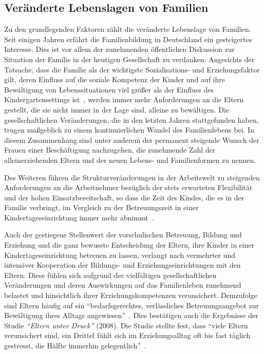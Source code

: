\documentclass[12pt,a4paper]{article}
\begin{document}
\subsection{Veränderte Lebenslagen von Familien}
Zu den grundlegenden Faktoren zählt die veränderte Lebenslage von Familien. Seit einigen Jahren erfährt die Familienbildung in Deutschland ein gesteigertes Interesse. Dies ist vor allem der zunehmenden öffentlichen Diskussion zur Situation der Familie in der heutigen Gesellschaft zu verdanken. Angesichts der Tatsache, dass die Familie als der wichtigste Sozialisations- und Erziehungsfaktor gilt, deren Einfluss auf die soziale Kompetenz der Kinder und auf ihre Bewältigung von Lebenssituationen viel größer als der Einfluss des Kindergartensettings ist~\parencite{NUBBEK, Tietze_2005}, werden immer mehr Anforderungen an die Eltern gestellt, die sie nicht immer in der Lage sind, alleine zu bewältigen. Die gesellschaftlichen Veränderungen, die in den letzten Jahren stattgefunden haben, trugen maßgeblich zu einem kontinuierlichen Wandel des Familienlebens bei. In diesem Zusammenhang sind unter anderem der permanent steigende Wunsch der Frauen einer Beschäftigung nachzugehen, die zunehmende Zahl der alleinerziehenden Eltern und der neuen Lebens- und Familienformen zu nennen.

Des Weiteren führen die Strukturveränderungen in der Arbeitswelt zu steigenden Anforderungen an die Arbeitnehmer bezüglich der stets erwarteten Flexibilität und der hohen Einsatzbereitschaft, so dass die Zeit des Kindes, die es in der Familie verbringt, im Vergleich zu der Betreuungszeit in einer Kindertageseinrichtung immer mehr abnimmt~\parencite{Textor_2010}.	

Auch der gestiegene Stellenwert der vorschulischen Betreuung, Bildung und Erziehung und die ganz bewusste Entscheidung der Eltern, ihre Kinder in einer Kindertageseinrichtung betreuen zu lassen, verlangt nach vermehrter und intensiver Kooperation der Bildungs- und Erziehungseinrichtungen mit den Eltern. Diese fühlen sich aufgrund der vielfältigen gesellschaftlichen Veränderungen und deren Auswirkungen auf das Familienleben zunehmend belastet und hinsichtlich ihrer Erziehungskompetenzen verunsichert. Demzufolge sind Eltern häufig auf ein "`bedarfsgerechtes, verlässliches Betreuungsangebot zur Bewältigung ihres Alltags angewiesen"'~\parencite[S.~18]{Klein}. Dies bestätigen auch die Ergebnisse der Studie \textit{"`Eltern unter Druck"'} (2008). Die Studie stellte fest, dass "`viele Eltern verunsichert sind, ein Drittel fühlt sich im Erziehungsalltag oft bis fast täglich gestresst, die Hälfte immerhin gelegentlich"'~\parencite[S.~14]{Henry_Huthmacher}.
\end{document}

